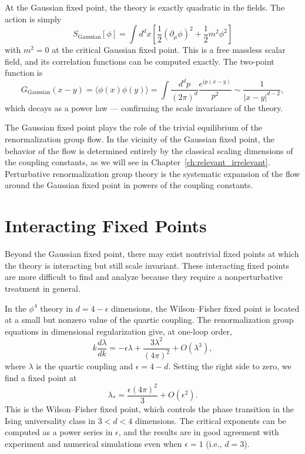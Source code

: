 \documentclass[11pt, twoside, openright]{book}
\theoremstyle{dotted}
\theoremstyle{definition}
\begin{document}
At the Gaussian fixed point, the theory is exactly quadratic in the fields. The
action is simply
\begin{equation}
  S_{\text{Gaussian}}[\phi] = \int d^dx \left[\frac{1}{2}(\partial_\mu\phi)^2
  + \frac{1}{2}m^2\phi^2\right]
\end{equation}
with $m^2 = 0$ at the critical Gaussian fixed point. This is a free massless scalar
field, and its correlation functions can be computed exactly. The two-point function
is
\begin{equation}
  G_{\text{Gaussian}}(x-y) = \langle\phi(x)\phi(y)\rangle
  = \int \frac{d^dp}{(2\pi)^d} \frac{e^{ip(x-y)}}{p^2}
  \sim \frac{1}{|x-y|^{d-2}},
  \label{eq:gaussian_propagator}
\end{equation}
which decays as a power law --- confirming the scale invariance of the theory.

The Gaussian fixed point plays the role of the trivial equilibrium of the
renormalization group flow. In the vicinity of the Gaussian fixed point, the
behavior of the flow is determined entirely by the classical scaling dimensions of
the coupling constants, as we will see in Chapter~\ref{ch:relevant_irrelevant}.
Perturbative renormalization group theory is the systematic expansion of the
flow around the Gaussian fixed point in powers of the coupling constants.

\section{Interacting Fixed Points}

Beyond the Gaussian fixed point, there may exist nontrivial fixed points at which
the theory is interacting but still scale invariant. These interacting fixed points
are more difficult to find and analyze because they require a nonperturbative
treatment in general.

In the $\phi^4$ theory in $d = 4 - \epsilon$ dimensions, the Wilson--Fisher fixed
point is located at a small but nonzero value of the quartic coupling. The
renormalization group equations in dimensional regularization give, at one-loop
order,
\begin{equation}
  k\frac{d\lambda}{dk} = -\epsilon\lambda + \frac{3\lambda^2}{(4\pi)^2} + O(\lambda^3),
  \label{eq:wf_rge}
\end{equation}
where $\lambda$ is the quartic coupling and $\epsilon = 4 - d$. Setting the right
side to zero, we find a fixed point at
\begin{equation}
  \lambda_* = \frac{\epsilon(4\pi)^2}{3} + O(\epsilon^2).
  \label{eq:wf_fixed_point}
\end{equation}
This is the Wilson--Fisher fixed point, which controls the phase transition in the
Ising universality class in $3 < d < 4$ dimensions. The critical exponents can be
computed as a power series in $\epsilon$, and the results are in good agreement
with experiment and numerical simulations even when $\epsilon = 1$ (i.e., $d = 3$).
\end{document}
